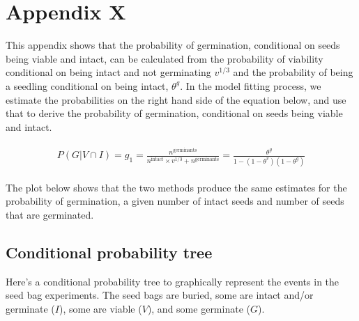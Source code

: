 \documentclass[12pt, oneside]{article}   	%
\begin{document}
\section*{Appendix X}

This appendix shows that the probability of germination, conditional on seeds being viable and intact, can be calculated from the probability of viability conditional on being intact and not germinating $v^{1/3}$ and the probability of being a seedling conditional on being intact, $\theta^g$. In the model fitting process, we estimate the probabilities on the right hand side of the equation below, and use that to derive the probability of germination, conditional on seeds being viable and intact.

    \begin{align}
\begin{split}
P(G | V \cap I)  = g_1 = \frac{n^{\mathrm{germinants}}}{n^{\mathrm{intact}}\times v^{1/3} + n^{\mathrm{germinants}}} = \frac{ \theta^g }{ 1-(1-\theta^v)(1-\theta^g)}
  \end{split}
\end{align}

The plot below shows that the two methods produce the same estimates for the probability of germination, a given number of intact seeds and number of seeds that are germinated.  

\subsection*{Conditional probability tree}

Here's a conditional probability tree to graphically represent the events in the seed bag experiments. The seed bags are buried, some are intact and/or germinate ($I$), some are viable ($V$), and some germinate ($G$). 
\end{document}
